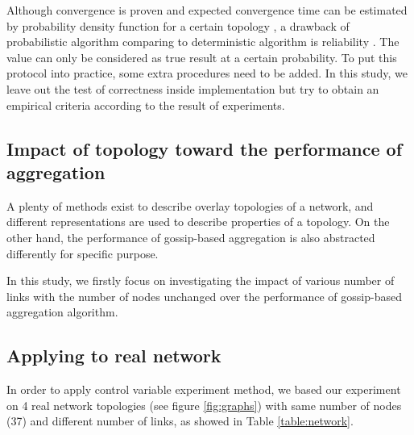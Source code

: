 Although convergence is proven and expected convergence time can be estimated by probability density function for a certain topology \cite{5929538}, a drawback of probabilistic algorithm comparing to deterministic algorithm is reliability \cite{Lynch:1996:DA:525656}. The value can only be considered as true result at a certain probability. To put this protocol into practice, some extra procedures need to be added. In this study, we leave out the test of correctness inside implementation but try to obtain an empirical criteria according to the result of experiments.

\subsection{Impact of topology toward the performance of aggregation}
A plenty of methods exist to describe overlay topologies of a network, and different representations are used to describe properties of a topology. On the other hand, the performance of gossip-based aggregation is also abstracted differently for specific purpose.

In this study, we firstly focus on investigating the impact of various number of links with the number of nodes unchanged over the performance of gossip-based aggregation algorithm. %

\subsection{Applying to real network}
In order to apply control variable experiment method, we based our experiment on 4 real network topologies (see figure \ref{fig:graphs}) with same number of nodes (37) and different number of links, as showed in Table \ref{table:network}. %

